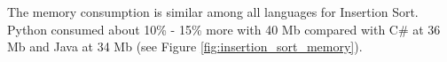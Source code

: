 The memory consumption is similar among all languages for Insertion Sort. Python consumed about 10\% - 15\% more with 40 Mb compared with C\# at 36 Mb and Java at 34 Mb (see Figure \ref{fig:insertion_sort_memory}).




















